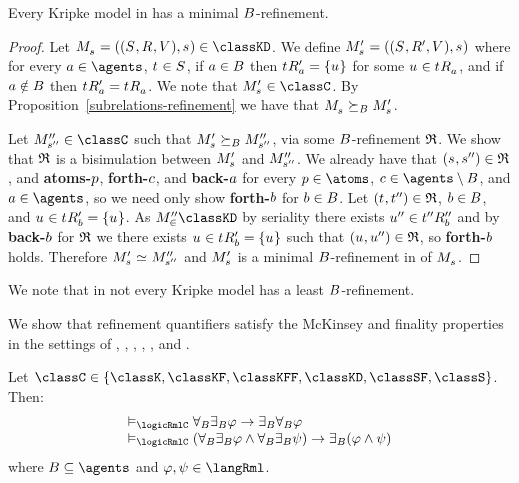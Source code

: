 \begin{proposition}\label{minimal-refinement-kd45}
Every Kripke model in \classKD{} has a minimal $B$-refinement.
\end{proposition}

\begin{proof}
Let $\kPModelAndTuple{\kStateS} \in \classKD$.
We define $\kPModelP{\kStateS} = ((\kStates, \kAccessibilityP{}, \kValuation), \kStateS)$ where for every $\agentA \in \agents$, $\kStateT \in \kStates$, if $a \in B$ then $\kSuccessorsPA{\kStateT} = \{\kStateU\}$ for some $\kStateU \in \kSuccessorsA{\kStateT}$, and if $a \notin B$ then $\kSuccessorsPA{\kStateT} = \kSuccessorsA{\kStateT}$.
We note that $\kPModelP{\kStateS} \in \classC$.
By Proposition~\ref{subrelations-refinement} we have that $\kPModel{\kStateS} \simulatesBs \kPModelP{\kStateS}$.

Let $\kPModelPP{\kStateSPP} \in \classC$ such that $\kPModelP{\kStateS} \simulatesBs \kPModelPP{\kStateSPP}$, via some $B$-refinement $\mathfrak{R}$.
We show that $\mathfrak{R}$ is a bisimulation between $\kPModelP{\kStateS}$ and ${M^{\prime\prime}_{{s}^{\prime\prime}}}$.
We already have that $(\kStateS, \kStateSPP) \in \refinement$, and {\bf atoms-$p$}, {\bf forth-$c$}, and {\bf back-$a$} for every $\atomP \in \atoms$, $\agentC \in \agents \setminus \agentsB$, and $\agentA \in \agents$, so we need only show {\bf forth-$b$} for $b \in B$.
Let $(\kStateT, \kStateTPP) \in \refinement$, $b \in B$, and $\kStateU \in \kSuccessorsPB{\kStateT} = \{\kStateU\}$.
As $\kPModelPP \in \classKD$ by seriality there exists ${u}^{\prime\prime} \in {{t}^{\prime\prime}} {R^{\prime\prime}_{b}}$ and by {\bf back-$b$} for $\mathfrak{R}$ we there exists $\kStateU \in \kSuccessorsPB{\kStateT} = \{\kStateU\}$ such that $(\kStateU, \kStateUPP) \in \refinement$, so {\bf forth-$b$} holds.
Therefore $\kPModelP{\kStateS} \bisimilar \kPModelPP{\kStateSPP}$ and $\kPModelP{\kStateS}$ is a minimal $B$-refinement in \classC{} of $\kPModel{\kStateS}$.
\end{proof}

We note that in \classKD{} not every Kripke model has a least $B$-refinement.

We show that refinement quantifiers satisfy the McKinsey and finality properties in the settings of \classK{}, \classKF{}, \classKFF{}, \classKD{}, \classSF{}, and \classS{}.

\begin{proposition}\label{rml-mckinsey}
Let $\classC \in \{\classK, \classKF, \classKFF, \classKD, \classSF, \classS\}$. Then:
$$
\begin{array}{l}
    \entails_\logicRmlC \allrefsBs \somerefsBs \phi \implies \somerefsBs \allrefsBs \phi\\
    \entails_\logicRmlC (\allrefsBs \somerefsBs \phi \land \allrefsBs \somerefsBs \psi) \implies \somerefsBs (\phi \land \psi)
\end{array}
$$
where $\agentsB \subseteq \agents$ and $\phi, \psi \in \langRml$.
\end{proposition}

